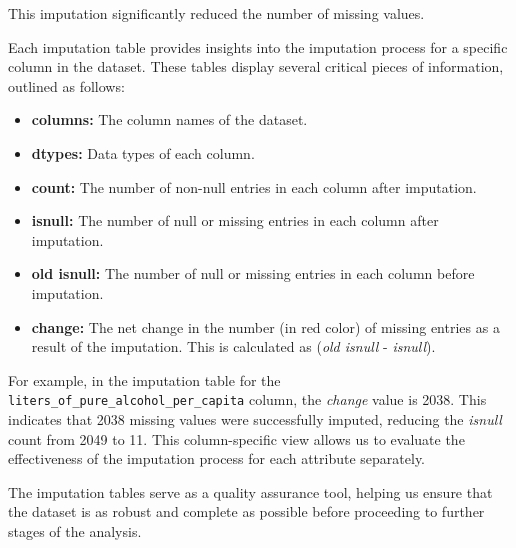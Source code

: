                 This imputation significantly reduced the number of missing values.


                Each imputation table provides insights into the imputation process for a specific column in the dataset. These tables display several critical pieces of information, outlined as follows:

                \begin{itemize}
                        \item \textbf{columns:} The column names of the dataset.
                        \item \textbf{dtypes:} Data types of each column.
                        \item \textbf{count:} The number of non-null entries in each column after imputation.
                        \item \textbf{isnull:} The number of null or missing entries in each column after imputation.
                        \item \textbf{old isnull:} The number of null or missing entries in each column before imputation.
                        \item \textbf{change:} The net change in the number (in red color) of missing entries as a result of the imputation. This is calculated as (\textit{old isnull} - \textit{isnull}).
                \end{itemize}

                For example, in the imputation table for the \texttt{liters\_of\_pure\_alcohol\_per\_capita} column, the \textit{change} value is 2038. This indicates that 2038 missing values were successfully imputed, reducing the \textit{isnull} count from 2049 to 11. This column-specific view allows us to evaluate the effectiveness of the imputation process for each attribute separately.

                The imputation tables serve as a quality assurance tool, helping us ensure that the dataset is as robust and complete as possible before proceeding to further stages of the analysis.

